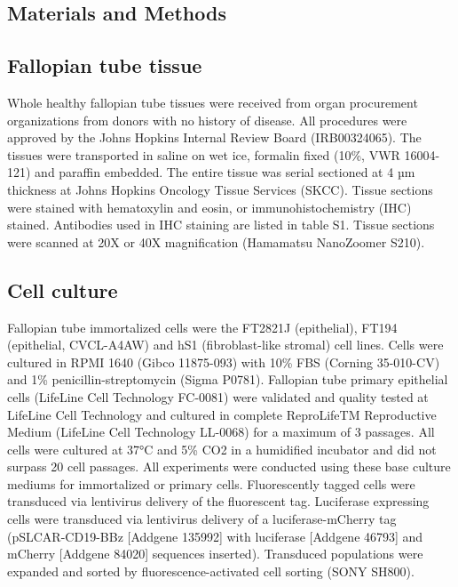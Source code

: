 \begin{refsection}
    \section{Materials and Methods}
    \subsection{Fallopian tube tissue}
    Whole healthy fallopian tube tissues were received from organ procurement organizations from donors with no history of disease. All procedures were approved by the Johns Hopkins Internal Review Board (IRB00324065). The tissues were transported in saline on wet ice, formalin fixed (10\%, VWR 16004-121) and paraffin embedded. The entire tissue was serial sectioned at 4 µm thickness at Johns Hopkins Oncology Tissue Services (SKCC). Tissue sections were stained with hematoxylin and eosin, or immunohistochemistry (IHC) stained. Antibodies used in IHC staining are listed in table S1. Tissue sections were scanned at 20X or 40X magnification (Hamamatsu NanoZoomer S210).
    
    \subsection{Cell culture}
    Fallopian tube immortalized cells were the FT2821J (epithelial)\cite{park2021a,wang2022a,jung2014a,song2019a}, FT194 (epithelial, CVCL-A4AW)\cite{wang2022a} and hS1 (fibroblast-like stromal)\cite{park2021a} cell lines. Cells were cultured in RPMI 1640 (Gibco 11875-093) with 10\% FBS (Corning 35-010-CV) and 1\% penicillin-streptomycin (Sigma P0781). Fallopian tube primary epithelial cells (LifeLine Cell Technology FC-0081) were validated and quality tested at LifeLine Cell Technology and cultured in complete ReproLifeTM Reproductive Medium (LifeLine Cell Technology LL-0068) for a maximum of 3 passages. All cells were cultured at 37°C and 5\% CO2 in a humidified incubator and did not surpass 20 cell passages. All experiments were conducted using these base culture mediums for immortalized or primary cells.
    Fluorescently tagged cells were transduced via lentivirus delivery of the fluorescent tag. Luciferase expressing cells were transduced via lentivirus delivery of a luciferase-mCherry tag (pSLCAR-CD19-BBz [Addgene 135992] with luciferase [Addgene 46793] and mCherry [Addgene 84020] sequences inserted). Transduced populations were expanded and sorted by fluorescence-activated cell sorting (SONY SH800).
    

\end{refsection}
